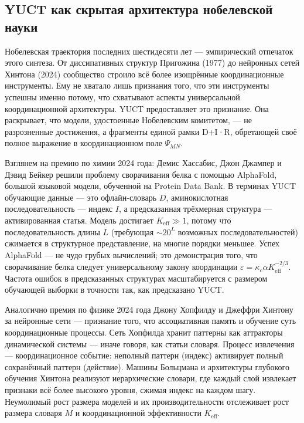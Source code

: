 \documentclass[12pt,a4paper]{article}
\begin{document}
	\subsection{YUCT как скрытая архитектура нобелевской науки}
	
	Нобелевская траектория последних шестидесяти лет — эмпирический отпечаток этого синтеза. От диссипативных структур Пригожина (1977) до нейронных сетей Хинтона (2024) сообщество строило всё более изощрённые координационные инструменты. Ему не хватало лишь признания того, что эти инструменты успешны именно потому, что схватывают аспекты универсальной координационной архитектуры. YUCT предоставляет это признание. Она раскрывает, что модели, удостоенные Нобелевским комитетом, — не разрозненные достижения, а фрагменты единой рамки D+I·R, обретающей своё полное выражение в координационном поле \(\Psi_{MN}\).
	
	Взглянем на премию по химии 2024 года: Демис Хассабис, Джон Джампер и Дэвид Бейкер решили проблему сворачивания белка с помощью AlphaFold, большой языковой модели, обученной на Protein Data Bank. В терминах YUCT обучающие данные — это офлайн-словарь \(D\), аминокислотная последовательность — индекс \(I\), а предсказанная трёхмерная структура — активированная статья. Модель достигает \(K_{\mathrm{eff}} \gg 1\), потому что последовательность длины \(L\) (требующая \(\sim 20^L\) возможных последовательностей) сжимается в структурное представление, на многие порядки меньшее. Успех AlphaFold — не чудо грубых вычислений; это демонстрация того, что сворачивание белка следует универсальному закону координации \(\varepsilon = \kappa_c \alpha K_{\mathrm{eff}}^{-2/3}\). Частота ошибок в предсказанных структурах масштабируется с размером обучающей выборки в точности так, как предсказано YUCT.
	
	Аналогично премия по физике 2024 года Джону Хопфилду и Джеффри Хинтону за нейронные сети — признание того, что ассоциативная память и обучение суть координационные процессы. Сеть Хопфилда хранит паттерны как аттракторы динамической системы — иначе говоря, как статьи словаря. Процесс извлечения — координационное событие: неполный паттерн (индекс) активирует полный сохранённый паттерн (действие). Машины Больцмана и архитектуры глубокого обучения Хинтона реализуют иерархические словари, где каждый слой извлекает признаки всё более высокого уровня, сжимая индекс на каждом шагу. Неумолимый рост размера моделей и их производительности отслеживает рост размера словаря \(M\) и координационной эффективности \(K_{\mathrm{eff}}\).
	
\end{document}

